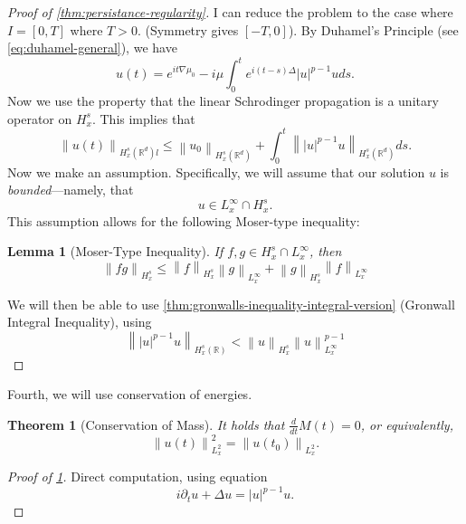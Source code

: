 \documentclass{article}
\newtheorem{theorem}{Theorem}
\newtheorem{lemma}{Lemma}
\def\R{\mathbb{R}} %
\newcommand\norm[1]{\left\lVert#1\right\rVert}
\begin{document}
\begin{proof}[Proof of \cref{thm:persistance-regularity}]
  I can reduce the problem to the case where $I=[0,T]$ where $T>0$. (Symmetry
  gives $[-T,0]$). By Duhamel's Principle (see \cref{eq:duhamel-general}), we
  have
  \begin{equation*}
    u(t) 
    = e^{it\nabla \mu_{0}}- i\mu \int_{0}^{t}e^{i(t-s)\Delta}\left| u \right|^{p-1}uds.
  \end{equation*}
  Now we use the property that the linear Schrodinger propagation is a unitary
  operator on $H^{s}_{x}$. This implies that
  \begin{equation*}
    \norm{u(t)}_{H^{s}_{x}(\R^d)l} 
    \leq
    \norm{u_{0}}_{H_{x}^{s}(\R^d)}
    + \int_{0}^{t} \norm{|u|^{p-1}u}_{H_{x}^{s}(\R^d)}ds. 
  \end{equation*}
  Now we make an assumption. Specifically, we will assume that our solution
  $u$ is \textit{bounded}---namely, that
  \begin{equation*}
    u\in  L_{x}^{\infty}\cap H^{s}_{x}.
  \end{equation*}
  This assumption allows for the following Moser-type inequality:
  \begin{lemma}[Moser-Type Inequality]
    \label{lem:moser-type-inequality}
    If $f,g\in H^{s}_{x}\cap L_{x}^{\infty}$,  then
    \begin{equation*}
      \norm{fg}_{H^{s}_{x}} 
      \leq \norm{f}_{H^{s}_{x}}\norm{g}_{L^{\infty}_{x}}
      + \norm{g}_{H^{s}_{x}}\norm{f}_{L^{\infty}_{x}}
    \end{equation*}
  \end{lemma}
  We will then be able to use \cref{thm:gronwalls-inequality-integral-version}
  (Gronwall Integral Inequality), using
  \begin{equation*}
    \norm{|u|^{p-1}u}_{H^{s}_{x}(\R)}< \norm{u}_{H^{s}_{x}}\norm{u}_{L_{x}^{\infty}}^{p-1}
  \end{equation*}
\end{proof}
Fourth, we will use conservation of energies.
\begin{theorem}[Conservation of Mass]
  \label{thm:conservation-mass}
  It holds that $\frac{d}{dt}M(t) = 0$, or equivalently,
  \begin{equation*}
    \norm{u(t)}_{L_{x}^{2}}^{2} = \norm{u(t_{0})}_{L_{x}^{2}}.
  \end{equation*}
\end{theorem}
\begin{proof}[Proof of \cref{thm:conservation-mass}]
  Direct computation, using equation
  \begin{equation*}
    i \partial_{t} u + \Delta u = |u|^{p-1}u.
  \end{equation*}
\end{proof}
\end{document}
